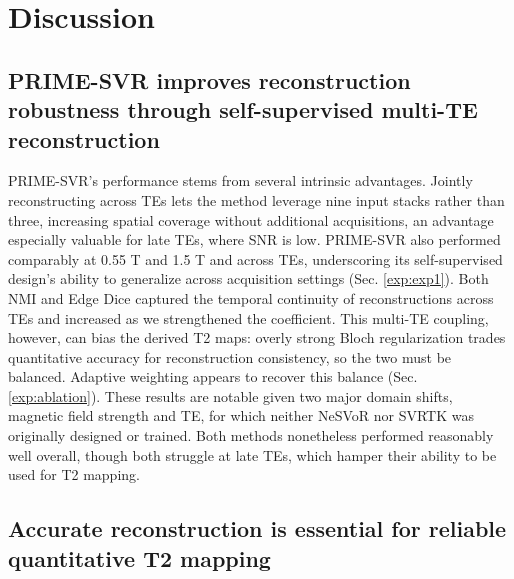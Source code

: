 \documentclass[preprint,authoryear,12pt]{elsarticle}
\begin{document}
\newpage
\section{Discussion}

\subsection{PRIME-SVR improves reconstruction robustness through self-supervised multi-TE reconstruction}
PRIME-SVR's performance stems from several intrinsic advantages. Jointly reconstructing across TEs lets the method leverage nine input stacks rather than three, increasing spatial coverage without additional acquisitions, an advantage especially valuable for late TEs, where SNR is low. PRIME-SVR also performed comparably at 0.55 T and 1.5 T and across TEs, underscoring its self-supervised design's ability to generalize across acquisition settings (Sec. \ref{exp:exp1}). Both NMI and Edge Dice captured the temporal continuity of reconstructions across TEs and increased as we strengthened the coefficient.
This multi-TE coupling, however, can bias the derived T2 maps: overly strong Bloch regularization trades quantitative accuracy for reconstruction consistency, so the two must be balanced. Adaptive weighting appears to recover this balance (Sec. \ref{exp:ablation}).
These results are notable given two major domain shifts, magnetic field strength and TE, for which neither NeSVoR nor SVRTK was originally designed or trained. Both methods nonetheless performed reasonably well overall, though both struggle at late TEs, which hamper their ability to be used for T2 mapping. 

\subsection{Accurate reconstruction is essential for reliable quantitative T2 mapping}
\end{document}
